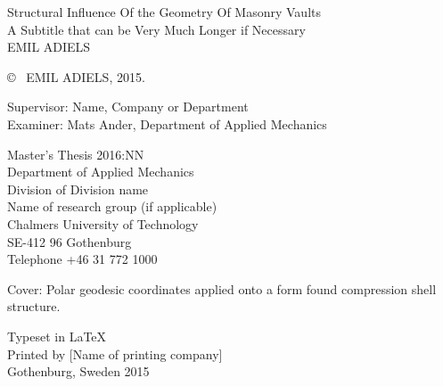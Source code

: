 \newpage
\thispagestyle{plain}
\vspace*{4.5cm}
Structural Influence Of the Geometry Of Masonry Vaults\\
A Subtitle that can be Very Much Longer if Necessary\\
EMIL ADIELS \setlength{\parskip}{1cm}

\copyright ~ EMIL ADIELS, 2015. \setlength{\parskip}{1cm}

Supervisor: Name, Company or Department\\
Examiner: Mats Ander, Department of Applied Mechanics  \setlength{\parskip}{1cm}

Master's Thesis 2016:NN\\	%
Department of Applied Mechanics\\
Division of Division name\\
Name of research group (if applicable)\\
Chalmers University of Technology\\
SE-412 96 Gothenburg\\
Telephone +46 31 772 1000 \setlength{\parskip}{0.5cm}

\vfill
Cover: Polar geodesic coordinates applied onto a form found compression shell structure. \setlength{\parskip}{0.5cm}

Typeset in \LaTeX \\
Printed by [Name of printing company]\\
Gothenburg, Sweden 2015

